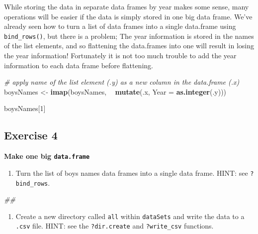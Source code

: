 \documentclass[
]{book}
\newenvironment{Shaded}{\begin{snugshade}}{\end{snugshade}}
\newcommand{\CommentTok}[1]{\textcolor[rgb]{0.56,0.35,0.01}{\textit{#1}}}
\newcommand{\DataTypeTok}[1]{\textcolor[rgb]{0.13,0.29,0.53}{#1}}
\newcommand{\DecValTok}[1]{\textcolor[rgb]{0.00,0.00,0.81}{#1}}
\newcommand{\KeywordTok}[1]{\textcolor[rgb]{0.13,0.29,0.53}{\textbf{#1}}}
\newcommand{\NormalTok}[1]{#1}
\newcommand{\OperatorTok}[1]{\textcolor[rgb]{0.81,0.36,0.00}{\textbf{#1}}}
\newcommand{\StringTok}[1]{\textcolor[rgb]{0.31,0.60,0.02}{#1}}
\providecommand{\tightlist}{%
  \setlength{\itemsep}{0pt}\setlength{\parskip}{0pt}}
\begin{document}
While storing the data in separate data frames by year makes some sense,
many operations will be easier if the data is simply stored in one big
data frame. We've already seen how to turn a list of data frames into a
single data.frame using \texttt{bind\_rows()}, but there is a problem; The year
information is stored in the names of the list elements, and so
flattening the data.frames into one will result in losing the year
information! Fortunately it is not too much trouble to add the year
information to each data frame before flattening.

\begin{Shaded}
\begin{Highlighting}[]
\CommentTok{# apply name of the list element (.y) as a new column in the data.frame (.x)}
\NormalTok{boysNames <-}\StringTok{ }\KeywordTok{imap}\NormalTok{(boysNames, }\OperatorTok{~}\StringTok{ }\KeywordTok{mutate}\NormalTok{(.x, }\DataTypeTok{Year =} \KeywordTok{as.integer}\NormalTok{(.y)))}

\NormalTok{boysNames[}\DecValTok{1}\NormalTok{]}
\end{Highlighting}
\end{Shaded}

\hypertarget{exercise-4-1}{%
\subsection{Exercise 4}\label{exercise-4-1}}

\textbf{Make one big \texttt{data.frame}}

\begin{enumerate}
\def\labelenumi{\arabic{enumi}.}
\tightlist
\item
  Turn the list of boys names data frames into a single data frame. HINT: see \texttt{?bind\_rows}.
\end{enumerate}

\begin{Shaded}
\begin{Highlighting}[]
\CommentTok{## }
\end{Highlighting}
\end{Shaded}

\begin{enumerate}
\def\labelenumi{\arabic{enumi}.}
\setcounter{enumi}{1}
\tightlist
\item
  Create a new directory called \texttt{all} within \texttt{dataSets} and write the data to a \texttt{.csv} file.
  HINT: see the \texttt{?dir.create} and \texttt{?write\_csv} functions.
\end{enumerate}
\end{document}
